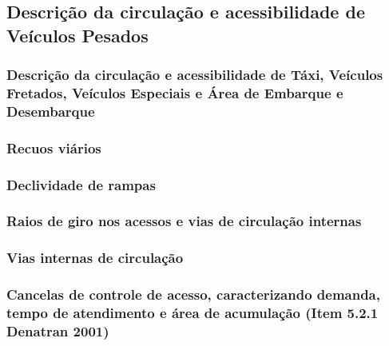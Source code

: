 \documentclass[]{article}
\begin{document}
\hypertarget{descriuxe7uxe3o-da-circulauxe7uxe3o-e-acessibilidade-de-veuxedculos-pesados}{%
\subsection{Descrição da circulação e acessibilidade de Veículos
Pesados}\label{descriuxe7uxe3o-da-circulauxe7uxe3o-e-acessibilidade-de-veuxedculos-pesados}}

\hypertarget{descriuxe7uxe3o-da-circulauxe7uxe3o-e-acessibilidade-de-tuxe1xi-veuxedculos-fretados-veuxedculos-especiais-e-uxe1rea-de-embarque-e-desembarque}{%
\subsubsection{Descrição da circulação e acessibilidade de Táxi,
Veículos Fretados, Veículos Especiais e Área de Embarque e
Desembarque}\label{descriuxe7uxe3o-da-circulauxe7uxe3o-e-acessibilidade-de-tuxe1xi-veuxedculos-fretados-veuxedculos-especiais-e-uxe1rea-de-embarque-e-desembarque}}

\hypertarget{recuos-viuxe1rios}{%
\subsubsection{Recuos viários}\label{recuos-viuxe1rios}}

\hypertarget{declividade-de-rampas}{%
\subsubsection{Declividade de rampas}\label{declividade-de-rampas}}

\hypertarget{raios-de-giro-nos-acessos-e-vias-de-circulauxe7uxe3o-internas}{%
\subsubsection{Raios de giro nos acessos e vias de circulação
internas}\label{raios-de-giro-nos-acessos-e-vias-de-circulauxe7uxe3o-internas}}

\hypertarget{vias-internas-de-circulauxe7uxe3o}{%
\subsubsection{Vias internas de
circulação}\label{vias-internas-de-circulauxe7uxe3o}}

\hypertarget{cancelas-de-controle-de-acesso-caracterizando-demanda-tempo-de-atendimento-e-uxe1rea-de-acumulauxe7uxe3o-item-5.2.1-denatran-2001}{%
\subsubsection{Cancelas de controle de acesso, caracterizando demanda,
tempo de atendimento e área de acumulação (Item 5.2.1 Denatran
2001)}\label{cancelas-de-controle-de-acesso-caracterizando-demanda-tempo-de-atendimento-e-uxe1rea-de-acumulauxe7uxe3o-item-5.2.1-denatran-2001}}
\end{document}
